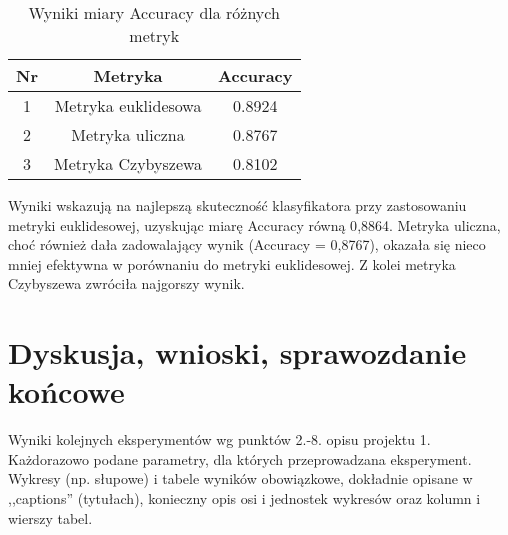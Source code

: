 \documentclass{article}
\begin{document}
\begin{table}[h!]
    \centering
    \begin{tabular}{|c|c|c|}
    \hline
    \textbf{Nr} & \textbf{Metryka} & \textbf{Accuracy} \\ \hline
    1 & Metryka euklidesowa & 0.8924\\ \hline
    2 & Metryka uliczna & 0.8767 \\ \hline
    3 & Metryka Czybyszewa & 0.8102 \\ \hline
    \end{tabular}
    \caption{Wyniki miary Accuracy dla różnych metryk}
\end{table}

Wyniki wskazują na najlepszą skuteczność klasyfikatora przy zastosowaniu metryki euklidesowej, uzyskując miarę Accuracy równą 0{,}8864. Metryka uliczna, choć również dała zadowalający wynik (Accuracy = 0{,}8767), okazała się nieco mniej efektywna w porównaniu do metryki euklidesowej. Z kolei metryka Czybyszewa zwróciła najgorszy wynik.


\section{Dyskusja, wnioski, sprawozdanie końcowe}

Wyniki kolejnych eksperymentów wg punktów 2.-8. opisu projektu 1.  Każdorazowo
podane parametry, dla których przeprowadzana eksperyment. 
Wykresy (np. słupowe) i tabele wyników
obowiązkowe, dokładnie opisane w ,,captions'' (tytułach), konieczny opis osi i
jednostek wykresów oraz kolumn i wierszy tabel.\\ 
\end{document}
